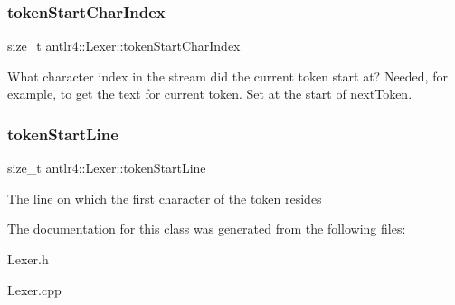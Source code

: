 \subsubsection{\texorpdfstring{token\+Start\+Char\+Index}{tokenStartCharIndex}}
{\footnotesize\ttfamily size\+\_\+t antlr4\+::\+Lexer\+::token\+Start\+Char\+Index}



What character index in the stream did the current token start at? Needed, for example, to get the text for current token. Set at the start of next\+Token. 

\mbox{\label{classantlr4_1_1Lexer_a1bef23fbfd7830dd7c526a2e016709e0}} 
\subsubsection{\texorpdfstring{token\+Start\+Line}{tokenStartLine}}
{\footnotesize\ttfamily size\+\_\+t antlr4\+::\+Lexer\+::token\+Start\+Line}



The line on which the first character of the token resides 



The documentation for this class was generated from the following files\+:\begin{DoxyCompactItemize}
\item 
Lexer.\+h\item 
Lexer.\+cpp\end{DoxyCompactItemize}
